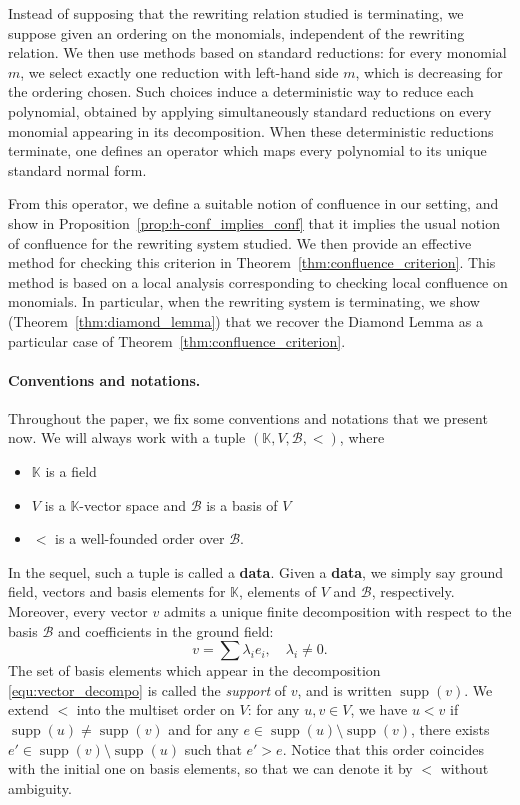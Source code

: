 \documentclass[10pt]{easychair}
\theoremstyle{definition}
\newcommand\data{{\color{red}\bf data}}
\DeclareMathOperator{\supp}{supp}
\newcommand\basis{\mathscr{B}}
\newcommand\K{\mathbb{K}}
\begin{document}
Instead of supposing that the rewriting relation studied is
terminating, we suppose given an ordering on the monomials,
independent of the rewriting relation.  We then use methods based on
standard reductions: for every monomial $m$, we select exactly one
reduction with left-hand side $m$, which is decreasing for the
ordering chosen. Such choices induce a deterministic way to reduce
each polynomial, obtained by applying simultaneously standard
reductions on every monomial appearing in its decomposition. When
these deterministic reductions terminate, one defines an operator
which maps every polynomial to its unique standard normal form.

From this operator, we define a suitable notion of confluence in
our setting, and show in Proposition~\ref{prop:h-conf_implies_conf}
that it implies the usual notion of confluence for the rewriting
system studied. We then provide an effective method for checking this
criterion in Theorem~\ref{thm:confluence_criterion}. This method is
based on a local analysis corresponding to checking local confluence
on monomials. In particular, when the rewriting system is terminating,
we show (Theorem~\ref{thm:diamond_lemma}) that we recover the Diamond
Lemma as a particular case of Theorem~\ref{thm:confluence_criterion}.

\paragraph{Conventions and notations.}

Throughout the paper, we fix some conventions and notations that we
present now. We will always work with a tuple  $(\K,V,\basis,<)$, where
\begin{itemize}
\item $\K$ is a field
\item $V$ is a $\K$-vector space and $\basis$ is a basis of $V$
\item $<$ is a well-founded order over $\basis$.
\end{itemize}
In the sequel, such a tuple is called a \data. Given a \data, we simply
say ground field, vectors and basis elements for $\K$, elements of $V$
and $\basis$, respectively. Moreover, every vector $v$ admits a unique
finite decomposition with respect to the basis $\basis$ and coefficients
in the ground field:
\begin{equation}\label{equ:vector_decompo}
  v=\sum\lambda_ie_i,\quad\lambda_i\neq 0.
\end{equation}
The set of basis elements which appear in the decomposition
\eqref{equ:vector_decompo} is called the {\it support} of $v$, and is
written $\supp(v)$. We extend $<$ into the multiset order on $V$: for any
$u,v \in V$, we have $u<v$ if $\supp(u)\neq\supp(v)$ and for any
$e\in\supp(u)\setminus\supp(v)$, there exists
$e'\in\supp(v)\setminus\supp(u)$ such that $e'>e$. Notice that this order
coincides with the initial one on basis elements, so that we can denote
it by $<$ without ambiguity.
\medskip
\end{document}
